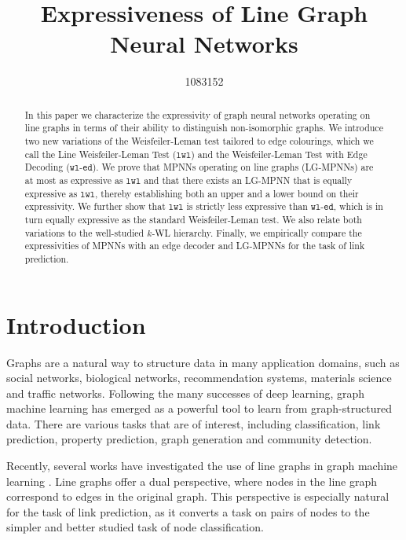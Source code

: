 \documentclass{article}
\title{Expressiveness of Line Graph Neural Networks}
\author{%
    1083152
}
\newcommand{\wledge}{\texttt{wl-ed}}
\newcommand{\lwl}{\texttt{lwl}}
\begin{document}
\maketitle


\begin{abstract}
    In this paper we characterize the expressivity of graph neural networks operating on line graphs in terms of their ability to distinguish non-isomorphic graphs. We introduce two new variations of the Weisfeiler-Leman test tailored to edge colourings, which we call the Line Weisfeiler-Leman Test ($\lwl$) and the Weisfeiler-Leman Test with Edge Decoding ($\wledge$).
    We prove that MPNNs operating on line graphs (LG-MPNNs) are at most as expressive as $\lwl$ and that there exists an LG-MPNN that is equally expressive as $\lwl$, thereby establishing both an upper and a lower bound on their expressivity. We further show that $\lwl$ is strictly less expressive than $\wledge$, which is in turn equally expressive as the standard Weisfeiler-Leman test. We also relate both variations to the well-studied $k$-WL hierarchy.
    Finally, we empirically compare the expressivities of MPNNs with an edge decoder and LG-MPNNs for the task of link prediction.
\end{abstract}


\section{Introduction}
Graphs are a natural way to structure data in many application domains, such as social networks, biological networks, recommendation systems, materials science and traffic networks.
Following the many successes of deep learning, graph machine learning has emerged as a powerful tool to learn from graph-structured data. There are various tasks that are of interest, including classification, link prediction, property prediction, graph generation and community detection.

Recently, several works have investigated the use of line graphs in graph machine learning \cite{cai2021line,choudhary2021atomistic,liu2021indigo}. Line graphs offer a dual perspective, where nodes in the line graph correspond to edges in the original graph. This perspective is especially natural for the task of link prediction, as it converts a task on pairs of nodes to the simpler and better studied task of node classification.
\end{document}
